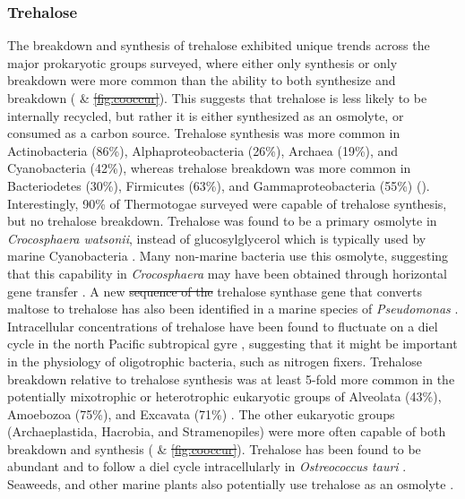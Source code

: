 \documentclass[utf8]{frontiersSCNS} %
\providecommand{\DIFaddtex}[1]{{\protect\color{blue}\uwave{#1}}} %
\providecommand{\DIFdeltex}[1]{{\protect\color{red}\sout{#1}}}                      %
\providecommand{\DIFaddbegin}{} %
\providecommand{\DIFaddend}{} %
\providecommand{\DIFdelbegin}{} %
\providecommand{\DIFdelend}{} %
\providecommand{\DIFadd}[1]{\texorpdfstring{\DIFaddtex{#1}}{#1}} %
\providecommand{\DIFdel}[1]{\texorpdfstring{\DIFdeltex{#1}}{}} %
\begin{document}
\subsubsection*{Trehalose}
The breakdown and synthesis of trehalose exhibited unique trends across the major prokaryotic groups surveyed, where either only synthesis or only breakdown were more common than the ability to both synthesize and breakdown ( \& \DIFdelbegin \DIFdel{\ref{fig:cooccur}}\DIFdelend \DIFaddbegin \DIFadd{\ref{fig:euk-bac-comp}}\DIFaddend ). This suggests that trehalose is less likely to be internally recycled, but rather it is either synthesized as an osmolyte, or consumed as a carbon source. Trehalose synthesis was more common in Actinobacteria (86\%), Alphaproteobacteria (26\%), Archaea (19\%), and Cyanobacteria (42\%), whereas trehalose breakdown was more common in Bacteriodetes (30\%), Firmicutes (63\%), and Gammaproteobacteria (55\%) (). Interestingly, 90\% of Thermotogae surveyed were capable of trehalose synthesis, but no trehalose breakdown. Trehalose was found to be a primary osmolyte in \emph{Crocosphaera watsonii}, instead of glucosylglycerol which is typically used by marine Cyanobacteria \citep{Pade2012}. Many non-marine bacteria use this osmolyte, suggesting that this capability in \emph{Crocosphaera} may have been obtained through horizontal gene transfer \citep{Pade2012}. A new \DIFdelbegin \DIFdel{sequence of the }\DIFdelend trehalose synthase gene that converts maltose to trehalose has also been identified in a marine species of \emph{Pseudomonas} \citep{Gao2013}. Intracellular concentrations of trehalose have been found to fluctuate on a diel cycle in the north Pacific subtropical gyre \citep{Boysen2020}, suggesting that it might be important in the physiology of oligotrophic bacteria, such as nitrogen fixers. Trehalose breakdown relative to trehalose synthesis was at least 5-fold more common in the potentially mixotrophic or heterotrophic eukaryotic groups of Alveolata (43\%), Amoebozoa (75\%), and Excavata (71\%) . The other eukaryotic groups (Archaeplastida, Hacrobia, and Stramenopiles) were more often capable of both breakdown and synthesis ( \& \DIFdelbegin \DIFdel{\ref{fig:cooccur}}\DIFdelend \DIFaddbegin \DIFadd{\ref{fig:euk-bac-comp}}\DIFaddend ). Trehalose has been found to be abundant and to follow a diel cycle intracellularly in \emph{Ostreococcus tauri} \citep{Hirth2017}. Seaweeds, and other marine plants also potentially use trehalose as an osmolyte \citep{Xuan2012,Danaraj2020}.
\end{document}
